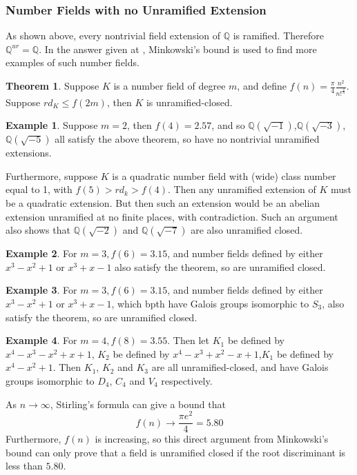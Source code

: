 \documentclass[12pt]{extarticle}
\newcommand{\Q}{\mathbb{Q}}
\newcommand{\<}{\langle}
\renewcommand{\>}{\rangle}
\theoremstyle{definition}
\newtheorem{theorem}{Theorem}
\newtheorem*{example}{Example}
\begin{document}
\subsubsection*{Number Fields with no Unramified Extension}
As shown above, every nontrivial field extension of $\Q$ is ramified. Therefore $\Q^{ur} = \Q$. In the answer given at \cite{CONRAD}, Minkowski's bound is used to find more examples of such number fields.
\begin{theorem}
Suppose $K$ is a number field of degree $m$, and define $f(n) = \frac{\pi}{4} \frac{n^2}{n!^{\frac{2}{n}}}$. Suppose $rd_K \leq f(2m)$, then $K$ is unramified-closed.
\end{theorem}
\begin{example}
Suppose $m=2$, then $f(4) = 2.57$, and so $\Q(\sqrt{-1})$,$\Q(\sqrt{-3})$,$\Q(\sqrt{-5})$ all satisfy the above theorem, so have no nontrivial unramified extensions.  
\end{example}
Furthermore, suppose $K$ is a quadratic number field with (wide) class number equal to 1, with $f(5) > rd_k > f(4)$. Then any unramified extension of $K$ must be a quadratic extension. But then such an extension would be an abelian extension unramified at no finite places, with contradiction. Such an argument also shows that $\Q(\sqrt{-2})$ and $\Q(\sqrt{-7})$ are also unramified closed. 

\begin{example} 

For $m=3, f(6) = 3.15$, and number fields defined by either $x^3-x^2+1$ or $x^3+x-1$ also satisfy the theorem, so are unramified closed.
\end{example}
\begin{example} 

For $m=3, f(6) = 3.15$, and number fields defined by either $x^3-x^2+1$ or $x^3+x-1$, which bpth have Galois groups isomorphic to $S_3$, also satisfy the theorem, so are unramified closed.
\end{example}
\begin{example} 

For $m=4, f(8) = 3.55$. Then let $K_1$ be defined by $x^4 - x^3 - x^2 + x + 1$, $K_2$ be defined by $x^4 - x^3 + x^2 - x + 1$,$K_1$ be defined by $x^4 - x^2 + 1$. Then $K_1$, $K_2$ and $K_3$ are all unramified-closed, and have Galois groups isomorphic to $D_4$, $C_4$ and $V_4$ respectively. 
\end{example}


As $n\rightarrow \infty$, Stirling's formula can give a bound that
\begin{equation}
    f(n) \rightarrow \frac{\pi e^2}{4} = 5.80
\end{equation}
Furthermore, $f(n)$ is increasing, so this direct argument from Minkowski's bound can only prove that a field is unramified closed if the root discriminant is less than $5.80$. 
\end{document}
